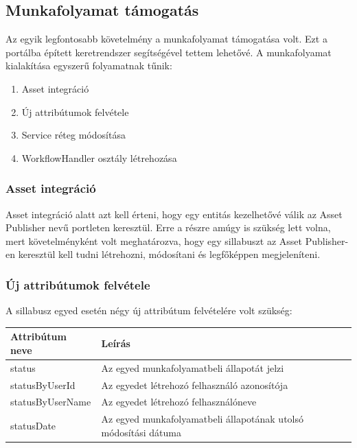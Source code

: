 \documentclass[hidelinks, 12pt, a4paper]{report}
\begin{document}
\subsection{Munkafolyamat támogatás}

Az egyik legfontosabb követelmény a munkafolyamat támogatása volt. Ezt a portálba épített keretrendszer segítségével tettem lehetővé. A munkafolyamat kialakítása egyszerű folyamatnak tűnik:
\begin{enumerate}
\item Asset integráció
\item Új attribútumok felvétele
\item Service réteg módosítása
\item WorkflowHandler osztály létrehozása
\end{enumerate}

\subsubsection{Asset integráció}

Asset integráció alatt azt kell érteni, hogy egy entitás kezelhetővé válik az Asset Publisher nevű portleten keresztül. Erre a részre amúgy is szükség lett volna, mert követelményként volt meghatározva, hogy egy sillabuszt az Asset Publisher-en keresztül kell tudni létrehozni, módosítani és legfőképpen megjeleníteni.

\subsubsection{Új attribútumok felvétele}

A sillabusz egyed esetén négy új attribútum felvételére volt szükség:
\begin{table}[H]
	\centering
	\begin{tabular}{| l | l | l |}
	\hline
	\textbf{Attribútum neve} & \textbf{Leírás} \\
	\hline
	status & Az egyed munkafolyamatbeli állapotát jelzi \\
	\hline
	statusByUserId & Az egyedet létrehozó felhasználó azonosítója \\
	\hline
	statusByUserName & Az egyedet létrehozó felhasználóneve \\
	\hline
	statusDate & Az egyed munkafolyamatbeli állapotának utolsó módosítási dátuma \\
	\hline
\end{tabular}
\end{table}
\end{document}
